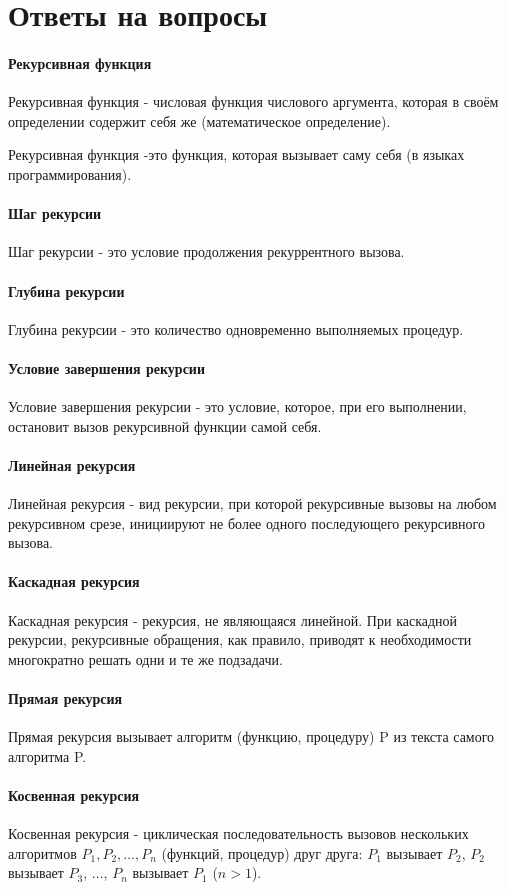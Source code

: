\documentclass[a4paper, 14pt]{extarticle}
\begin{document}

\newpage
\tableofcontents
\newpage
\section{Ответы на вопросы}
\paragraph{Рекурсивная функция}
Рекурсивная функция - числовая функция числового аргумента,
которая в своём определении содержит себя же (математическое определение).

Рекурсивная функция -это функция, которая вызывает саму себя (в языках программирования).
\paragraph{Шаг рекурсии}
Шаг рекурсии - это условие продолжения рекуррентного вызова.
\paragraph{Глубина рекурсии}
Глубина рекурсии - это количество одновременно выполняемых процедур.
\paragraph{Условие завершения рекурсии}
Условие завершения рекурсии - это условие, которое, при его выполнении,
остановит вызов рекурсивной функции самой себя.
\paragraph{Линейная рекурсия}
Линейная рекурсия - вид рекурсии, при которой рекурсивные вызовы
на любом рекурсивном срезе, инициируют
не более одного последующего рекурсивного вызова.
\paragraph{Каскадная рекурсия}
Каскадная рекурсия - рекурсия, не являющаяся линейной.
При каскадной рекурсии, рекурсивные обращения, как правило,
приводят к необходимости многократно решать одни и те же подзадачи.
\paragraph{Прямая рекурсия}
Прямая  рекурсия  вызывает  алгоритм (функцию, процедуру)
P из текста самого алгоритма P.
\paragraph{Косвенная рекурсия}
Косвенная рекурсия - циклическая последовательность вызовов нескольких алгоритмов
$P_1, P_2, \ldots, P_n$ (функций, процедур) друг друга:
$P_1$ вызывает $P_2$, $P_2$ вызывает $P_3$, $\ldots$, $P_n$ вызывает $P_1$ ($n > 1$).
\end{document}
